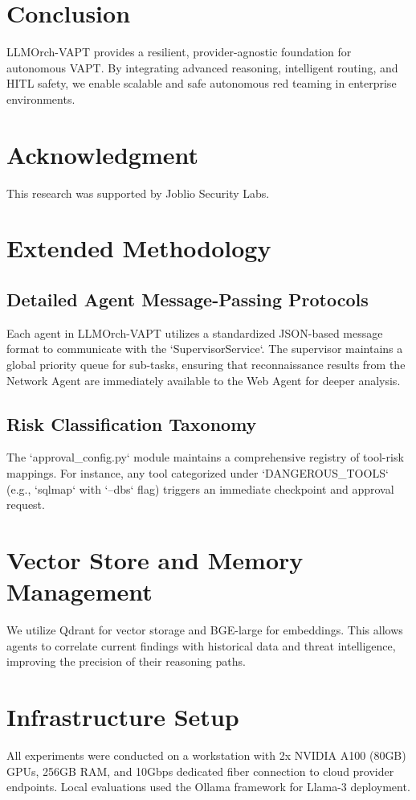 \documentclass[conference,compsoc]{IEEEtran}
\begin{document}
\section{Conclusion}
LLMOrch-VAPT provides a resilient, provider-agnostic foundation for autonomous VAPT. By integrating advanced reasoning, intelligent routing, and HITL safety, we enable scalable and safe autonomous red teaming in enterprise environments.

\section*{Acknowledgment}
This research was supported by Joblio Security Labs.




\appendix
\section{Extended Methodology}
\subsection{Detailed Agent Message-Passing Protocols}
Each agent in LLMOrch-VAPT utilizes a standardized JSON-based message format to communicate with the `SupervisorService`. The supervisor maintains a global priority queue for sub-tasks, ensuring that reconnaissance results from the Network Agent are immediately available to the Web Agent for deeper analysis.

\subsection{Risk Classification Taxonomy}
The `approval\_config.py` module maintains a comprehensive registry of tool-risk mappings. For instance, any tool categorized under `DANGEROUS\_TOOLS` (e.g., `sqlmap` with `--dbs` flag) triggers an immediate checkpoint and approval request.

\section{Vector Store and Memory Management}
We utilize Qdrant for vector storage and BGE-large for embeddings. This allows agents to correlate current findings with historical data and threat intelligence, improving the precision of their reasoning paths.

\section{Infrastructure Setup}
All experiments were conducted on a workstation with 2x NVIDIA A100 (80GB) GPUs, 256GB RAM, and 10Gbps dedicated fiber connection to cloud provider endpoints. Local evaluations used the Ollama framework for Llama-3 deployment.
\end{document}
